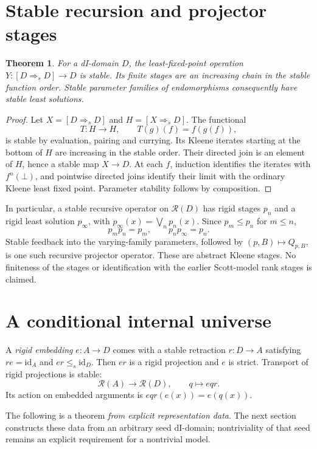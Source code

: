 \documentclass[11pt]{article}
\newtheorem{theorem}{Theorem}[section]
\newcommand{\id}{\mathrm{id}}
\begin{document}
\section{Stable recursion and projector stages}

\begin{theorem}
For a dI-domain $D$, the least-fixed-point operation
$Y:[D\Rightarrow_s D]\to D$ is stable. Its finite stages are an increasing
chain in the stable function order. Stable parameter families of
endomorphisms consequently have stable least solutions.
\end{theorem}
\begin{proof}
Let $X=[D\Rightarrow_s D]$ and $H=[X\Rightarrow_s D]$. The functional
\[
 T:H\to H,\qquad T(g)(f)=f(g(f)),
\]
is stable by evaluation, pairing and currying. Its Kleene iterates
starting at the bottom of $H$ are increasing in the stable order.
Their directed join is an element of $H$, hence a stable map $X\to D$.
At each $f$, induction identifies the iterates with $f^n(\bot)$, and
pointwise directed joins identify their limit with the ordinary Kleene
least fixed point. Parameter stability follows by composition.
\end{proof}

In particular, a stable recursive operator on $\mathcal R(D)$ has rigid
stages $p_n$ and a rigid least solution $p_\infty$, with
$p_\infty(x)=\bigvee_n p_n(x)$. Since $p_m\le p_n$ for $m\le n$,
\[
 p_m p_n=p_m,\qquad p_n p_\infty=p_n.
\]
Stable feedback into the varying-family parameters, followed by
$(p,B)\mapsto Q_{p,B}$, is one such recursive projector operator.
These are abstract Kleene stages. No finiteness of the stages or
identification with the earlier Scott-model rank stages is claimed.

\section{A conditional internal universe}

A \emph{rigid embedding} $e:A\to D$ comes with a stable retraction
$r:D\to A$ satisfying $re=\id_A$ and $er\le_s\id_D$.
Then $er$ is a rigid projection and $e$ is strict. Transport of rigid
projections is stable:
\[
 \mathcal R(A)\longrightarrow\mathcal R(D),\qquad q\longmapsto eqr.
\]
Its action on embedded arguments is $eqr(e(x))=e(q(x))$.

The following is a theorem \emph{from explicit representation data}.
The next section constructs these data from an arbitrary seed dI-domain;
nontriviality of that seed remains an explicit requirement for a
nontrivial model.
\end{document}
